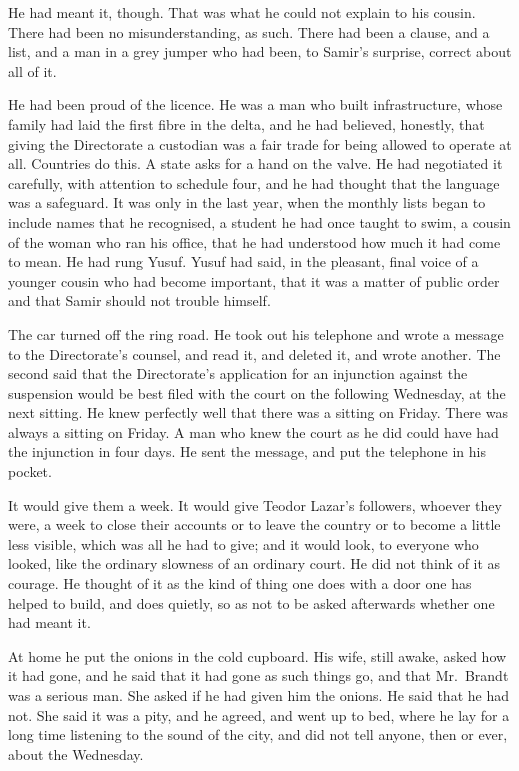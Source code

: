 He had meant it, though. That was what he could not explain to his cousin. There had been no misunderstanding, as such. There had been a clause, and a list, and a man in a grey jumper who had been, to Samir's surprise, correct about all of it.

He had been proud of the licence. He was a man who built infrastructure, whose family had laid the first fibre in the delta, and he had believed, honestly, that giving the Directorate a custodian was a fair trade for being allowed to operate at all. Countries do this. A state asks for a hand on the valve. He had negotiated it carefully, with attention to schedule four, and he had thought that the language was a safeguard. It was only in the last year, when the monthly lists began to include names that he recognised, a student he had once taught to swim, a cousin of the woman who ran his office, that he had understood how much it had come to mean. He had rung Yusuf. Yusuf had said, in the pleasant, final voice of a younger cousin who had become important, that it was a matter of public order and that Samir should not trouble himself.

The car turned off the ring road. He took out his telephone and wrote a message to the Directorate's counsel, and read it, and deleted it, and wrote another. The second said that the Directorate's application for an injunction against the suspension would be best filed with the court on the following Wednesday, at the next sitting. He knew perfectly well that there was a sitting on Friday. There was always a sitting on Friday. A man who knew the court as he did could have had the injunction in four days. He sent the message, and put the telephone in his pocket.

It would give them a week. It would give Teodor Lazar's followers, whoever they were, a week to close their accounts or to leave the country or to become a little less visible, which was all he had to give; and it would look, to everyone who looked, like the ordinary slowness of an ordinary court. He did not think of it as courage. He thought of it as the kind of thing one does with a door one has helped to build, and does quietly, so as not to be asked afterwards whether one had meant it.

At home he put the onions in the cold cupboard. His wife, still awake, asked how it had gone, and he said that it had gone as such things go, and that Mr.~Brandt was a serious man. She asked if he had given him the onions. He said that he had not. She said it was a pity, and he agreed, and went up to bed, where he lay for a long time listening to the sound of the city, and did not tell anyone, then or ever, about the Wednesday.

